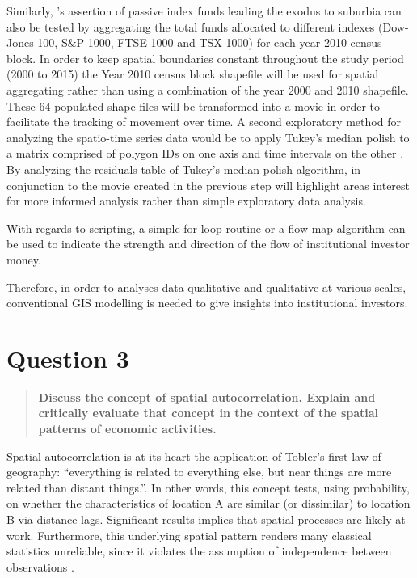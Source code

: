 \documentclass[12pt,letterpaper,notitlepage,onecolumn,final,openbib]{article}
\begin{document}
	Similarly, 's assertion of passive index funds leading the exodus to suburbia can also be tested by aggregating the total funds allocated to different indexes (Dow-Jones 100, S\&P 1000, FTSE 1000 and TSX 1000) for each year 2010 census block.  In order to keep spatial boundaries constant throughout the study period (2000 to 2015) the Year 2010 census block shapefile will be used for spatial aggregating rather than using a combination of the year 2000 and 2010 shapefile. These 64 populated shape files will be transformed into a movie in order to facilitate the tracking of movement over time.  A second exploratory method for analyzing the spatio-time series data would be to apply Tukey's median polish to a matrix comprised of polygon IDs on one axis and time intervals on the other \cite{tukey77,STMedianPolish}.  By analyzing the residuals table of Tukey's median polish algorithm, in conjunction to the movie created in the previous step will highlight areas interest for more informed analysis rather than simple exploratory data analysis.   
	
	With regards to scripting, a simple for-loop routine or a flow-map algorithm can be used to indicate the strength and direction of the flow of institutional investor money. 
	
	Therefore, in order to analyses data qualitative and qualitative at various scales, conventional GIS modelling is needed to give insights into institutional investors. 
	
	\section{Question 3}
	\begin{quotation}
		\textbf{Discuss the concept of spatial autocorrelation. Explain and critically evaluate that concept in the context of the spatial patterns of economic activities.}
	\end{quotation}
	
	Spatial autocorrelation is at its heart the application of Tobler's first law of geography: ``everything is related to everything else, but near things are more related than distant things.''\cite[page  236]{toblera1970}.  In other words, this concept tests, using probability, on whether the characteristics of location A are similar (or dissimilar) to location B via distance lags.   Significant results implies that spatial processes are likely at work.  Furthermore, this underlying spatial pattern renders many classical statistics unreliable, since it violates the assumption of independence between observations \cite{fischer2009handbook}. 
	
\end{document}
